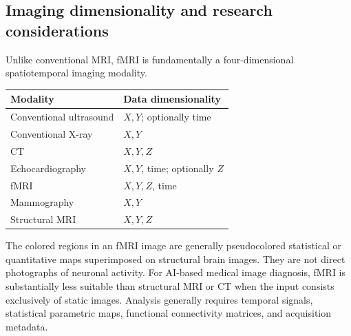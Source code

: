 \subsection{Imaging dimensionality and research considerations}
Unlike conventional MRI, fMRI is fundamentally a four-dimensional spatiotemporal imaging modality.
\begin{center}
\begin{tabular}{@{}ll@{}}
\toprule
\textbf{Modality} & \textbf{Data dimensionality} \\
\midrule
Conventional ultrasound & $X, Y$; optionally time \\
Conventional X-ray & $X, Y$ \\
CT & $X, Y, Z$ \\
Echocardiography & $X, Y$, time; optionally $Z$ \\
fMRI & $X, Y, Z$, time \\
Mammography & $X, Y$ \\
Structural MRI & $X, Y, Z$ \\
\bottomrule
\end{tabular}
\end{center}

The colored regions in an fMRI image are generally pseudocolored statistical or quantitative maps superimposed on structural brain images. They are not direct photographs of neuronal activity. For AI-based medical image diagnosis, fMRI is substantially less suitable than structural MRI or CT when the input consists exclusively of static images. Analysis generally requires temporal signals, statistical parametric maps, functional connectivity matrices, and acquisition metadata.

